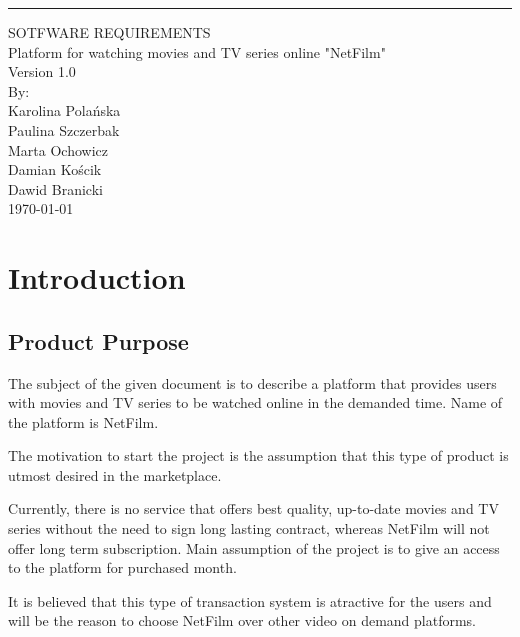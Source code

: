 \documentclass{scrreprt}
\date{}
\def\myversion{1.0 }
\begin{document}
\begin{flushright}
    \rule{16cm}{5pt}\vskip1cm
    \begin{bfseries}
        \Huge{SOTFWARE REQUIREMENTS}\\
        \vspace{4cm}
        Platform for watching movies and TV series online "NetFilm"\\
        \vspace{1cm}
        \LARGE{Version \myversion}\\
        \vspace{1cm}
        By:\\
        Karolina Polańska\\
        Paulina Szczerbak\\
        Marta Ochowicz\\
        Damian Kościk\\
        Dawid Branicki\\
        \vspace{3cm}
        \today\\
    \end{bfseries}
\end{flushright}

\tableofcontents

\chapter{Introduction}

\section{Product Purpose}

The subject of the given document is to describe a platform that provides users with movies and TV series to be watched online in the demanded time. Name of the platform is NetFilm.

The motivation to start the project is the assumption that this type of product is utmost desired in the marketplace.

Currently, there is no service that offers best quality, up-to-date movies and TV series without the need to sign long lasting contract, whereas  NetFilm will not offer long term subscription. Main assumption of the project is to give an access to the platform for purchased month.

It is believed that this type of transaction system is atractive for the users and will be the reason to choose NetFilm over other video on demand platforms.
\end{document}

